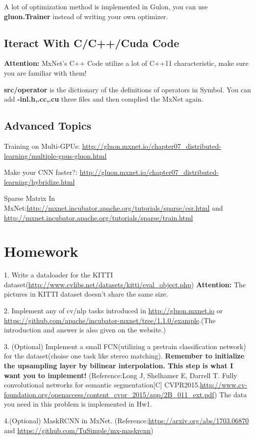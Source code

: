 \documentclass[english]{../TeXTemplate/pkupaper}
\begin{document}
A lot of optimization method is implemented in Gulon, you can use \textbf{gluon.Trainer} instead of writing your own optimizer.



\subsection{Iteract With C/C++/Cuda Code}

\textbf{Attention:} MxNet's C++ Code utilize a lot of C++11 characteristic, make sure you are familiar with them!

\textbf{src/operator} is the dictionary of the definitions of operators in Symbol. You can add \textbf{-inl.h,.cc,.cu} three files and then complied the MxNet again.
\subsection{Advanced Topics}

Training on Multi-GPUs: \url{http://gluon.mxnet.io/chapter07_distributed-learning/multiple-gpus-gluon.html}

Make your CNN faster?: \url{http://gluon.mxnet.io/chapter07_distributed-learning/hybridize.html}

Sparse Matrix In MxNet:\url{http://mxnet.incubator.apache.org/tutorials/sparse/csr.html} and \url{http://mxnet.incubator.apache.org/tutorials/sparse/train.html}


\section{Homework}

1. Write a dataloader for the KITTI dataset(\url{http://www.cvlibs.net/datasets/kitti/eval_object.php}) \textbf{Attention:} The pictures in KITTI dataset doesn't share the same size.

2. Implement any of cv/nlp tasks introduced in \url{http://gluon.mxnet.io} or \url{https://github.com/apache/incubator-mxnet/tree/1.1.0/example}.(The introduction and answer is also given on the website.)

3. (Optional) Implement a small FCN(utilizing a pretrain classification network) for the dataset(choise one task like stereo matching). \textbf{Remember to initialize the upsampling layer by bilinear interpolation. This step is what I want you to implement!} (Reference:Long J, Shelhamer E, Darrell T. Fully convolutional networks for semantic segmentation[C] CVPR2015.\url{http://www.cv-foundation.org/openaccess/content_cvpr_2015/app/2B_011_ext.pdf}) The data you need in this problem is implemented in Hw1.

4.(Optional) MaskRCNN in MxNet. (Reference:\url{https://arxiv.org/abs/1703.06870} and \url{https://github.com/TuSimple/mx-maskrcnn})
\end{document}
